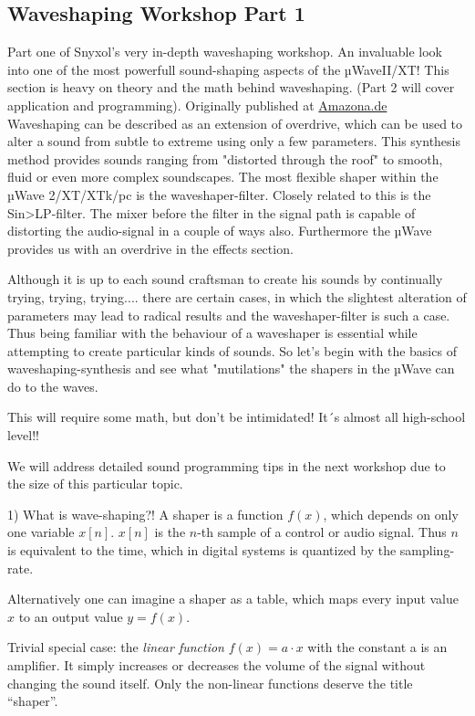 \subsection{Waveshaping Workshop Part 1}
Part one of Snyxol's very in-depth waveshaping workshop. An invaluable look into one of the most powerfull sound-shaping aspects of the µWaveII/XT! This section is heavy on theory and the math behind waveshaping. (Part 2 will cover application and programming). Originally published at \href{https://www.amazona.de/workshop-waveshaping-mit-dem-waldorf-microwave/}{Amazona.de}\\
Waveshaping can be described as an extension of overdrive, which can be used to alter a sound from subtle to extreme using only a few parameters. This synthesis method provides sounds ranging from "distorted through the roof" to smooth, fluid or even more complex soundscapes. The most flexible shaper within the µWave 2/XT/XTk/pc is the waveshaper-filter. Closely related to this is the Sin>LP-filter. The mixer before the filter in the signal path is capable of distorting the audio-signal in a couple of ways also. Furthermore the µWave provides us with an overdrive in the effects section.

Although it is up to each sound craftsman to create his sounds by continually trying, trying, trying.... there are certain cases, in which the slightest alteration of parameters may lead to radical results and the waveshaper-filter is such a case. Thus being familiar with the behaviour of a waveshaper is essential while attempting to create particular kinds of sounds. So let's begin with the basics of waveshaping-synthesis and see what "mutilations" the shapers in the µWave can do to the waves.

This will require some math, but don't be intimidated! It´s almost all high-school level!!

We will address detailed sound programming tips in the next workshop due to the size of this particular topic.

1) What is wave-shaping?!
A shaper is a function $f(x)$, which depends on only one variable $x[n]$. $x[n]$ is the $n$-th sample of a control or audio signal. Thus $n$ is equivalent to the time, which in digital systems is quantized by the sampling-rate.

Alternatively one can imagine a shaper as a table, which maps every input value $x$ to an output value $y=f(x)$.

Trivial special case: the \emph{linear function} $f(x)=a\cdot x$ with the constant a is an amplifier. It simply increases or decreases the volume of the signal without changing the sound itself. Only the non-linear functions deserve the title ``shaper''.

